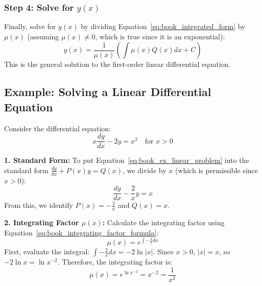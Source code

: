 \documentclass[12pt, letterpaper]{book}
\begin{document}
\subsubsection{Step 4: Solve for $y(x)$}
Finally, solve for $y(x)$ by dividing Equation~\ref{eq:book_integrated_form} by $\mu(x)$ (assuming $\mu(x) \neq 0$, which is true since it is an exponential):
\begin{equation}
    y(x) = \frac{1}{\mu(x)} \left( \int \mu(x)Q(x)dx + C \right)
    \label{eq:book_linear_de_solution}
\end{equation}
This is the general solution to the first-order linear differential equation.

\subsection{Example: Solving a Linear Differential Equation}
\label{ssec:book_example_linear_de}
Consider the differential equation:
\begin{equation}
    x\frac{dy}{dx} - 2y = x^2 \quad \text{for } x > 0
    \label{eq:book_ex_linear_problem}
\end{equation}

\textbf{1. Standard Form:}
To put Equation~\ref{eq:book_ex_linear_problem} into the standard form $\frac{dy}{dx} + P(x)y = Q(x)$, we divide by $x$ (which is permissible since $x > 0$):
\begin{equation}
    \frac{dy}{dx} - \frac{2}{x}y = x
    \label{eq:book_ex_linear_standard}
\end{equation}
From this, we identify $P(x) = -\frac{2}{x}$ and $Q(x) = x$.

\textbf{2. Integrating Factor $\mu(x)$:}
Calculate the integrating factor using Equation~\ref{eq:book_integrating_factor_formula}:
\begin{equation}
    \mu(x) = e^{\int -\frac{2}{x}dx}
\end{equation}
First, evaluate the integral: $\int -\frac{2}{x}dx = -2\ln|x|$. Since $x > 0$, $|x|=x$, so $-2\ln x = \ln x^{-2}$.
Therefore, the integrating factor is:
\begin{equation}
    \mu(x) = e^{\ln x^{-2}} = x^{-2} = \frac{1}{x^2}
\end{equation}
\end{document}
